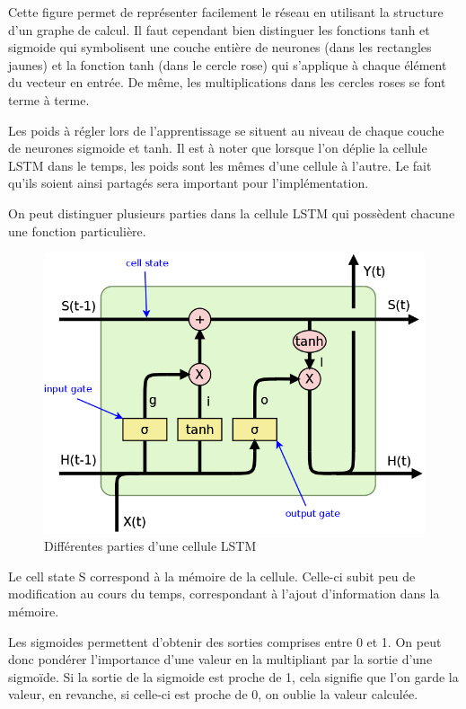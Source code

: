 \documentclass{report}
\theoremstyle{plain}
\theoremstyle{definition}
\theoremstyle{remark}
\begin{document}
Cette figure permet de représenter facilement le réseau en utilisant la structure d'un graphe de calcul. Il faut cependant bien distinguer les fonctions tanh et sigmoide qui symbolisent une couche entière de neurones (dans les rectangles jaunes) et la fonction tanh (dans le cercle rose) qui s'applique à chaque élément du vecteur en entrée. De même, les multiplications dans les cercles roses se font terme à terme.

Les poids à régler lors de l'apprentissage se situent au niveau de chaque couche de neurones sigmoide et tanh. Il est à noter que lorsque l'on déplie la cellule LSTM dans le temps, les poids sont les mêmes d'une cellule à l'autre. Le fait qu'ils soient ainsi partagés sera important pour l'implémentation.

On peut distinguer plusieurs parties dans la cellule LSTM qui possèdent chacune une fonction particulière.

\begin{figure}[h!]
\begin{center}
\includegraphics[scale=0.2]{images/LSTM_article_gates.png}
\caption{Différentes parties d'une cellule LSTM}
\label{cellule LSTM gates}
\end{center}
\end{figure}

Le cell state S correspond à la mémoire de la cellule. Celle-ci subit peu de modification au cours du temps, correspondant à l'ajout d'information dans la mémoire.

Les sigmoides permettent d'obtenir des sorties comprises entre 0 et 1. On peut donc pondérer l'importance d'une valeur en la multipliant par la sortie d'une sigmoïde. Si la sortie de la sigmoide est proche de 1, cela signifie que l'on garde la valeur, en revanche, si celle-ci est proche de 0, on oublie la valeur calculée.
\end{document}
